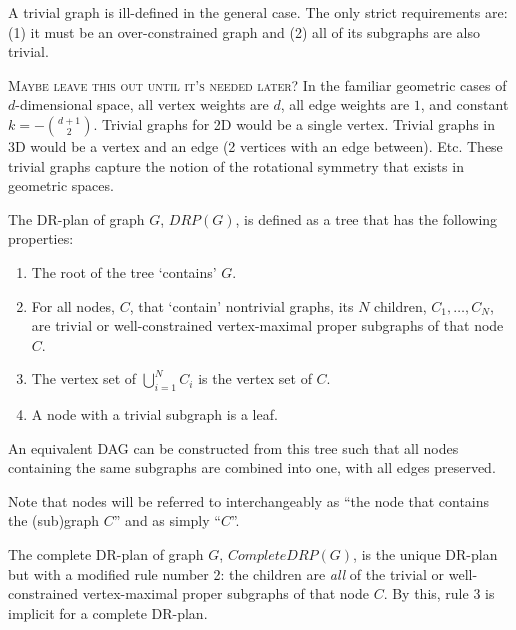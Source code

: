 \documentclass[11pt]{article}
\newcommand{\todo}[1]{\textsc{{\color{red}#1}}}
\begin{document}
\begin{definition}
A trivial graph is ill-defined in the general case. The only strict requirements are: (1) it must be an over-constrained graph and (2) all of its subgraphs are also trivial.

\todo{Maybe leave this out until it's needed later?}
In the familiar geometric cases of $d$-dimensional space, all vertex weights are $d$, all edge weights are $1$, and constant $k= -{{d+1}\choose{2}}$. Trivial graphs for 2D would be a single vertex. Trivial graphs in 3D would be a vertex and an edge (2 vertices with an edge between). Etc. These trivial graphs capture the notion of the rotational symmetry that exists in geometric spaces.
\end{definition}

\begin{definition}
The DR-plan of graph $G$, $DRP(G)$, is defined as a tree that has the following properties:
\begin{enumerate}
    \item The root of the tree `contains' $G$.
    \item For all nodes, $C$, that `contain' nontrivial graphs, its $N$ children, $C_1, \ldots, C_N$, are trivial or well-constrained vertex-maximal proper subgraphs of that node $C$.
    \item The vertex set of $\bigcup_{i=1}^N{C_i}$ is the vertex set of $C$.
    \item A node with a trivial subgraph is a leaf.
\end{enumerate}

An equivalent DAG can be constructed from this tree such that all nodes containing the same subgraphs are combined into one, with all edges preserved.

Note that nodes will be referred to interchangeably as ``the node that contains the (sub)graph $C$'' and as simply ``$C$''.
\end{definition}

\begin{definition}
The complete DR-plan of graph $G$, $CompleteDRP(G)$, is the unique DR-plan but with a modified rule number 2: the children are \textit{all} of the trivial or well-constrained vertex-maximal proper subgraphs of that node $C$. By this, rule 3 is implicit for a complete DR-plan.
\end{definition}
\end{document}
